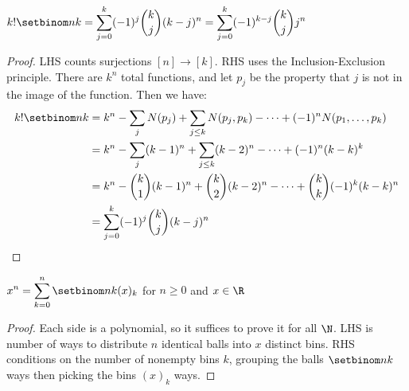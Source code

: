 \documentclass[a4paper]{article}
\begin{document}
\begin{theorem}\label{surjection_count}
$\displaystyle k!\setbinom nk
=\sum_{j=0}^k(-1)^j\binom kj(k-j)^n
=\sum_{j=0}^k(-1)^{k-j}\binom kjj^n$

\begin{hl}
\begin{proof}
LHS counts surjections $[n]\rightarrow[k]$. RHS uses the Inclusion-Exclusion principle. There are $k^n$ total functions, and let $p_j$ be the property that $j$ is not in the image of the function. Then we have:
\begin{align*}
k!\setbinom nk
&=k^n-\sum_jN(p_j)+\sum_{j\leq k}N(p_j,p_k)-\cdots+(-1)^nN(p_1,\dots,p_k)\\
&=k^n-\sum_j(k-1)^n+\sum_{j\leq k}(k-2)^n-\cdots+(-1)^n(k-k)^k\\
&=k^n-\binom k1(k-1)^n+\binom k2(k-2)^n-\cdots+\binom kk(-1)^k(k-k)^n\\
&=\sum_{j=0}^k(-1)^j\binom kj(k-j)^n\qedhere
\end{align*}
\end{proof}
\end{hl}
\end{theorem}

\begin{theorem}\label{monomial_as_falling}
$\displaystyle x^n=\sum_{k=0}^n\setbinom nk(x)_k$ for $n\geq0$ and $x\in\R$

\begin{hl}
\begin{proof}
Each side is a polynomial, so it suffices to prove it for all $\N$. LHS is number of ways to distribute $n$ identical balls into $x$ distinct bins. RHS conditions on the number of nonempty bins $k$, grouping the balls $\setbinom nk$ ways then picking the bins $(x)_k$ ways.
\end{proof}
\end{hl}
\end{theorem}
\end{document}
